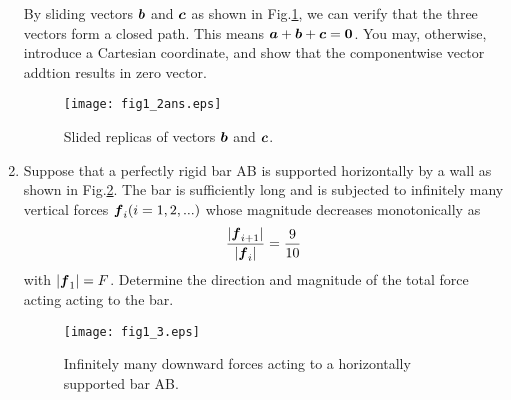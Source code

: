 \documentclass[10pt,a4j]{article}
\begin{document}
\begin{enumerate}
    {\small
        By sliding vectors $\mbox{\boldmath $b$}$ and $\mbox{\boldmath $c$}$ as shown in Fig.\ref{fig:fig1_2ans}, we can verify that the three vectors form a closed path. This means $\mbox{\boldmath $a$}+\mbox{\boldmath $b$}+\mbox{\boldmath $c$}=\mbox{\boldmath $0$}$. You may, otherwise, introduce a Cartesian coordinate, and show that the componentwise vector addtion results in zero vector. 
    }
    \begin{figure}[h]
        \begin{center}
        \texttt{[image: fig1\_2ans.eps]} 
        \end{center}
        \caption{Slided replicas of vectors $\mbox{\boldmath $b$}$ and $\mbox{\boldmath $c$}$.} 
        \label{fig:fig1_2ans}
    \end{figure}
\item
    Suppose that a perfectly rigid bar AB is supported horizontally by a wall as shown in Fig.\ref{fig:fig1_3}. The bar is sufficiently long and is subjected to infinitely many vertical forces $\mbox{\boldmath $f$}_i (i=1,2,...)$ whose magnitude decreases monotonically as 
    \[
         \frac{ |\mbox{\boldmath $f$}_{i+1}| }{ |\mbox{\boldmath $f$}_i| } =\frac{9}{10} 
    \]
with $|\mbox{\boldmath $f$}_1|=F$. Determine the direction and magnitude of the total force acting acting to the bar.\\
\begin{figure}[h]
    \begin{center}
    \texttt{[image: fig1\_3.eps]} 
    \end{center}
    \caption{Infinitely many downward forces acting to a horizontally supported bar AB.}
    \label{fig:fig1_3}
\end{figure}


\end{enumerate}
\end{document}
